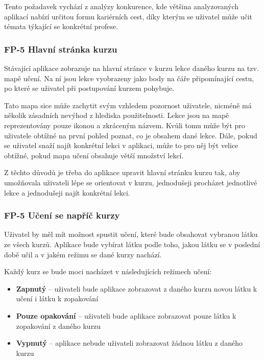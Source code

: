 Tento požadavek vychází z analýzy konkurence, kde většina analyzovaných aplikací nabízí určitou formu kariérních cest, díky kterým se uživatel může učit témata týkající se konkrétní profese.

\subsubsection{FP-5 Hlavní stránka kurzu}

Stávající aplikace zobrazuje na hlavní stránce v kurzu lekce daného kurzu na tzv. mapě učení. Na ní jsou lekce vyobrazeny jako body na čáře připomínající cestu, po které se uživatel při postupování kurzem pohybuje.

Tato mapa sice může zachytit svým vzhledem pozornost uživatele, nicméně má několik zásadních nevýhod z hlediska použitelnosti. Lekce jsou na mapě reprezentovány pouze ikonou a zkráceným názvem. Kvůli tomu může být pro uživatele obtížné na první pohled poznat, co je obsahem dané lekce. Dále, pokud se uživatel snaží najít konkrétní lekci v aplikaci, může to pro něj být velice obtížné, pokud mapa učení obsahuje větší množství lekcí.

Z těchto důvodů je třeba do aplikace upravit hlavní stránku kurzu tak, aby umožňovala uživateli lépe se orientovat v kurzu, jednodušeji procházet jednotlivé lekce a jednodušeji najít konkrétní lekci.

\subsubsection{FP-5 Učení se napříč kurzy}

Uživatel by měl mít možnost spustit učení, které bude obsahovat vybranou látku ze všech kurzů. Aplikace bude vybírat látku podle toho, jakou látku se v poslední době učil a v jakém režimu se dané kurzy nachází.

Každý kurz se bude moci nacházet v následujících režimech učení:

\begin{itemize}
    \item \textbf{Zapnutý} -- uživateli bude aplikace zobrazovat z daného kurzu novou látku k učení i látku k zopakování
    \item \textbf{Pouze opakování} -- uživateli bude aplikace zobrazovat pouze látku k zopakování z daného kurzu
    \item \textbf{Vypnutý} -- aplikace nebude uživateli zobrazovat žádnou látku z daného kurzu
\end{itemize}

